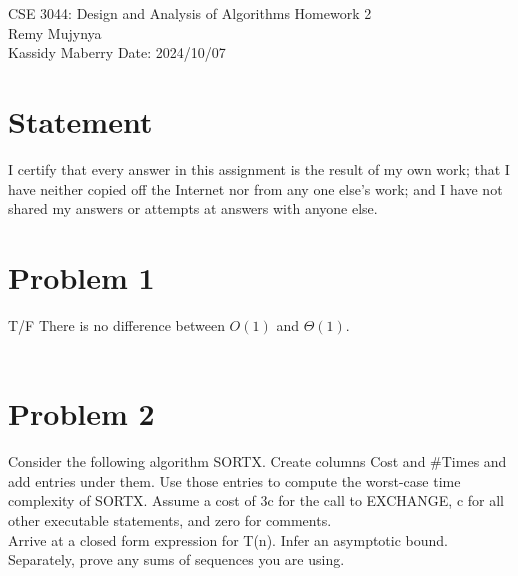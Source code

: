 \documentclass{article}
\begin{document}
\begin{center}
    {\huge
        CSE 3044: Design and Analysis of Algorithms Homework 2\\
    }
    {\large Remy Mujynya\\
          Kassidy Maberry}
    Date: 2024/10/07
\end{center}
\section*{Statement}
I certify that every answer in this assignment is the result of my own work; that
I have neither copied off the Internet nor from any one else's work; and I have
not shared my answers or attempts at answers with anyone else.\\

\section*{Problem 1}
T/F There is no difference between $O(1)$ and $\Theta(1)$.\\\\

\section*{Problem 2}
Consider the following algorithm SORTX. Create columns Cost and #Times and add
entries under them. Use those entries to compute the worst-case time complexity
of SORTX. Assume a cost of 3c for the call to EXCHANGE, c for all other executable
statements, and zero for comments.\\
Arrive at a closed form expression for T(n). Infer an asymptotic bound.\\
Separately, prove any sums of sequences you are using.\\\\
\end{document}
